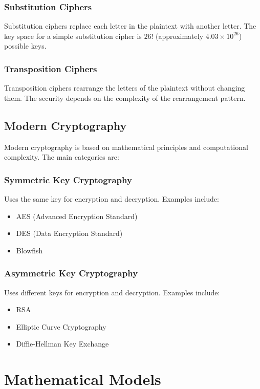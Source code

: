 \documentclass[12pt,a4paper]{article}
\begin{document}
\subsubsection{Substitution Ciphers}
Substitution ciphers replace each letter in the plaintext with another letter. The key space for a simple substitution cipher is $26!$ (approximately $4.03 \times 10^{26}$) possible keys.

\subsubsection{Transposition Ciphers}
Transposition ciphers rearrange the letters of the plaintext without changing them. The security depends on the complexity of the rearrangement pattern.

\subsection{Modern Cryptography}
Modern cryptography is based on mathematical principles and computational complexity. The main categories are:

\subsubsection{Symmetric Key Cryptography}
Uses the same key for encryption and decryption. Examples include:
\begin{itemize}
    \item AES (Advanced Encryption Standard)
    \item DES (Data Encryption Standard)
    \item Blowfish
\end{itemize}

\subsubsection{Asymmetric Key Cryptography}
Uses different keys for encryption and decryption. Examples include:
\begin{itemize}
    \item RSA
    \item Elliptic Curve Cryptography
    \item Diffie-Hellman Key Exchange
\end{itemize}

\section{Mathematical Models}
\end{document}

